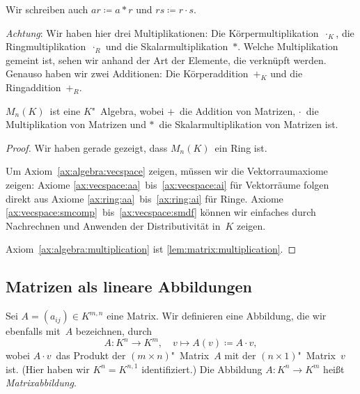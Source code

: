 \documentclass[a4paper]{article}
\begin{document}
\begin{notation}
    Wir schreiben auch $ar \coloneqq a*r$ und $rs \coloneqq r\cdot s$.
\end{notation}

\emph{Achtung}: Wir haben hier drei Multiplikationen: Die Körpermultiplikation~$\cdot_K$, die Ringmultiplikation~$\cdot_R$ und die Skalarmultiplikation~$*$. Welche Multiplikation gemeint ist, sehen wir anhand der Art der Elemente, die verknüpft werden. Genauso haben wir zwei Additionen: Die Körperaddition~$+_K$ und die Ringaddition~$+_R$.

\begin{lemma}
    $M_n(K)$~ist eine $K$"~Algebra, wobei $+$~die Addition von Matrizen, $\cdot$~die Multiplikation von Matrizen und $*$~die Skalarmultiplikation von Matrizen ist.
\end{lemma}

\begin{proof}
    Wir haben gerade gezeigt, dass $M_n(K)$~ein Ring ist.
    
    Um Axiom~\ref{ax:algebra:vecspace} zeigen, müssen wir die Vektorraumaxiome zeigen: Axiome \ref{ax:vecspace:aa}~bis~\ref{ax:vecspace:ai} für Vektorräume folgen direkt aus Axiome \ref{ax:ring:aa}~bis~\ref{ax:ring:ai} für Ringe. Axiome \ref{ax:vecspace:smcomp}~bis~\ref{ax:vecspace:smdf} können wir einfaches durch Nachrechnen und Anwenden der Distributivität in~$K$ zeigen.

    Axiom~\ref{ax:algebra:multiplication} ist \cref{lem:matrix:multiplication}.
\end{proof}

\subsection{Matrizen als lineare Abbildungen}

\begin{definition}[Matrixabbildung]
    Sei $A = (a_{ij}) \in K^{m,n}$ eine Matrix. Wir definieren eine Abbildung, die wir ebenfalls mit~$A$ bezeichnen, durch
    \begin{equation*}
        A\colon K^n \to K^m,\quad v \mapsto A(v) \coloneqq A\cdot v,
    \end{equation*}
    wobei $A\cdot v$~das Produkt der $(m\times n)$"~Matrix~$A$ mit der $(n\times 1)$"~Matrix~$v$ ist. (Hier haben wir $K^n = K^{n,1}$ identifiziert.) Die Abbildung $A\colon K^n \to K^m$ heißt \emph{Matrixabbildung}.
\end{definition}
\end{document}
